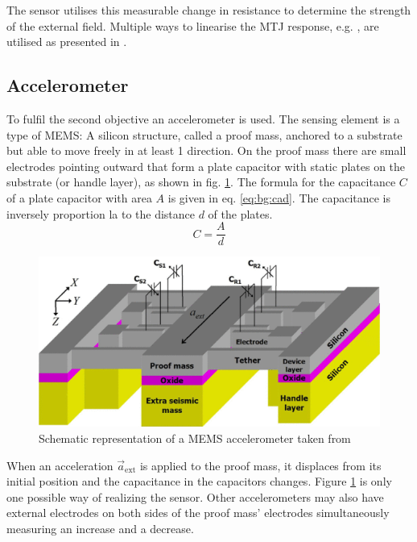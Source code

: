 The sensor utilises this measurable change in resistance to determine the strength of the external field. Multiple ways to linearise the \ac{MTJ} response, e.g. , are utilised as presented in \parencite{yan2022}.

\subsection{Accelerometer \label{sec:bg:accelerometers}}
To fulfil the second objective an accelerometer is used. The sensing element is a type of \ac{MEMS}: A silicon structure, called a proof mass, anchored to a substrate but able to move freely in at least 1 direction. On the proof mass there are small electrodes pointing outward that form a plate capacitor with static plates on the substrate (or handle layer), as shown in fig. \ref{fig:bg:mems_accelerometer}. The formula for the capacitance $C$ of a plate capacitor with area $A$ is given in eq. \eqref{eq:bg:cad}. The capacitance is inversely proportion la to the distance $d$ of the plates.
\begin{equation}
    C=\frac{A}{d}
    \label{eq:bg:cad}
\end{equation}

\begin{figure}[H]
    \centering
    \includegraphics[width=\linewidth]{images/01_background/mems_acc_diagram.png}
    \caption{Schematic representation of a \ac{MEMS} accelerometer taken from \parencite{abdolvand2007}}
    \label{fig:bg:mems_accelerometer}
\end{figure}

When an acceleration $\vec{a}_{\mathrm{ext}}$ is applied to the proof mass, it displaces from its initial position and the capacitance in the capacitors changes. Figure \ref{fig:bg:mems_accelerometer} is only one possible way of realizing the sensor. Other accelerometers may also have external electrodes on both sides of the proof mass' electrodes simultaneously measuring an increase and a decrease. 


